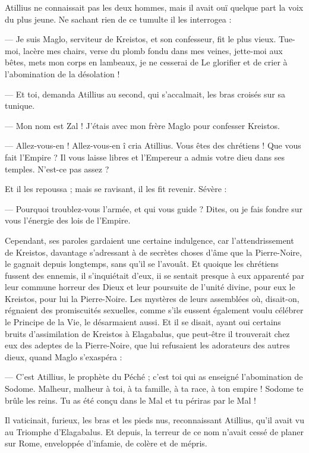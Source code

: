 \documentclass[a4paper, 11pt, oneside, polutonikogreek, french]{article}
\begin{document}
Atillius ne connaissait pas les deux hommes, mais il avait ouï quelque part la voix du plus jeune. Ne sachant rien de ce tumulte il les interrogea :

--- Je suis Maglo, serviteur de Kreistos, et son confesseur, fit le plus vieux. Tue-moi, lacère mes chairs, verse du plomb fondu dans mes veines, jette-moi aux bêtes, mets mon corps en lambeaux, je ne cesserai de Le glorifier et de crier à l'abomination de la désolation !

--- Et toi, demanda Atillius au second, qui s'accalmait, les bras croisés sur sa tunique.

--- Mon nom est Zal ! J'étais avec mon frère Maglo pour confesser Kreistos.

--- Allez-vous-en ! Allez-vous-en î cria Atillius. Vous êtes des chrétiens ! Que vous fait l'Empire ? Il vous laisse libres et l'Empereur a admis votre dieu dans ses temples. N'est-ce pas assez ?

Et il les repoussa ; mais se ravisant, il les fit revenir. Sévère :

--- Pourquoi troublez-vous l'armée, et qui vous guide ? Dites, ou je fais fondre sur vous l'énergie des lois de l'Empire.

Cependant, ses paroles gardaient une certaine indulgence, car l'attendrissement de Kreistos, davantage s'adressant à de secrètes choses d'âme que la Pierre-Noire, le gagnait depuis longtemps, sans qu'il se l'avouât. Et quoique les chrétiens fussent des ennemis, il s'inquiétait d'eux, ii se sentait presque à eux apparenté par leur commune horreur des Dieux et leur poursuite de l'unité divine, pour eux le Kreistos, pour lui la Pierre-Noire. Les mystères de leurs assemblées où, disait-on, régnaient des promiscuités sexuelles, comme s'ils eussent également voulu célébrer le Principe de la Vie, le désarmaient aussi. Et il se disait, ayant oui certains bruits d'assimilation de Kreistos à Elagabalus, que peut-être il trouverait chez eux des adeptes de la Pierre-Noire, que lui refusaient les adorateurs des autres dieux, quand Maglo s'exaspéra :

--- C'est Atillius, le prophète du Péché ; c'est toi qui as enseigné l'abomination de Sodome. Malheur, malheur à toi, à ta famille, à ta race, à ton empire ! Sodome te brûle les reins. Tu as été conçu dans le Mal et tu périras par le Mal !

Il vaticinait, furieux, les bras et les pieds nus, reconnaissant Atillius, qu'il avait vu au Triomphe d'Elagabalus. Et depuis, la terreur de ce nom n'avait cessé de planer sur Rome, enveloppée d'infamie, de colère et de mépris.
\end{document}
